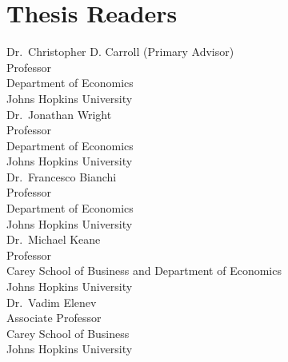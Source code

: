 %
\section*{Thesis Readers}
\begin{singlespace}
%
\noindent Dr.~Christopher D. Carroll (Primary Advisor)\\
\indent \indent Professor\\
\indent \indent Department of Economics\\
\indent \indent Johns Hopkins University\\

\noindent Dr.~Jonathan Wright\\
\indent \indent Professor\\
\indent \indent Department of Economics\\
\indent \indent Johns Hopkins University\\

\noindent Dr.~Francesco Bianchi\\
\indent \indent Professor\\
\indent \indent Department of Economics\\
\indent \indent Johns Hopkins University\\

\noindent Dr.~Michael Keane\\
\indent \indent Professor\\
\indent \indent Carey School of Business and Department of Economics\\
\indent \indent Johns Hopkins University\\

\noindent Dr.~Vadim Elenev\\
\indent \indent Associate Professor\\
\indent \indent Carey School of Business\\
\indent \indent Johns Hopkins University\\
%
%
\end{singlespace}